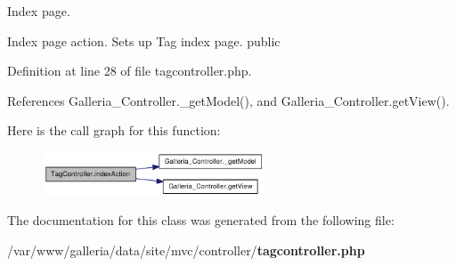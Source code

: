 Index page.

Index page action. Sets up Tag index page.  public 

Definition at line 28 of file tagcontroller.php.

References Galleria\_\-Controller.\_\-getModel(), and Galleria\_\-Controller.getView().

Here is the call graph for this function:\nopagebreak
\begin{figure}[H]
\begin{center}
\leavevmode
\includegraphics[width=187pt]{classTagController_3fc537f4d4a5b09ee8608a508151d6cc_cgraph}
\end{center}
\end{figure}


The documentation for this class was generated from the following file:\begin{CompactItemize}
\item 
/var/www/galleria/data/site/mvc/controller/{\bf tagcontroller.php}\end{CompactItemize}

